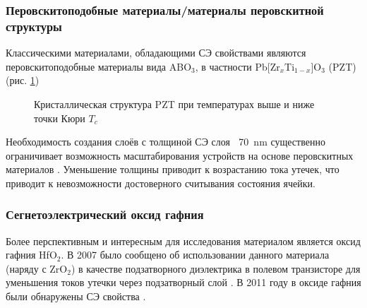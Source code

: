 \subsubsection{Перовскитоподобные материалы/материалы перовскитной структуры}
Классическими материалами, обладающими СЭ свойствами являются перовскитоподобные материалы вида ABO\(_3\), в частности Pb[Zr\(_x\)Ti\(_{1-x}\)]O\(_3\) (PZT) (рис. \cref{fig:pzt})
\begin{figure}[ht]
    \caption{Кристаллическая структура PZT при температурах выше и ниже точки Кюри \(T_c\)}\label{fig:pzt}
\end{figure}

Необходимость создания слоёв с толщиной СЭ слоя \(~\) \SI{70}{\nano\meter} существенно ограничивает возможность масштабирования устройств на основе перовскитных материалов \cite{parkReviewPerspectiveFerroelectric2018}. Уменьшение толщины приводит к возрастанию тока утечек, что приводит к невозможности достоверного считывания состояния ячейки.

\subsubsection{Сегнетоэлектрический оксид гафния}\label{sec:ch2/sec1}
Более перспективным и интересным для исследования материалом является оксид гафния HfO\(_2\). В 2007 было сообщено об использовании данного материала (наряду с ZrO\(_2\)) в качестве подзатворного диэлектрика в полевом транзисторе для уменьшения токов утечки через подзатворный слой \cite{bohrHighkSolution2007}. В 2011 году в оксиде гафния были обнаружены СЭ свойства \cite{bosckeFerroelectricityHafniumOxide2011}.

